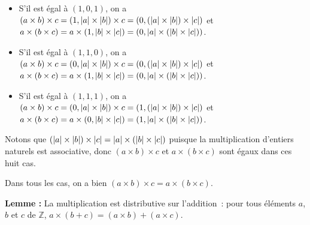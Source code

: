 \begin{itemize}[nosep]
\begin{itemize}[nosep]
                \item S'il est égal à $(1,0,1)$, on a 
                    $(a \times b) \times c = (1,\left\lvert a \right\rvert \times \left\lvert b \right\rvert) \times c = (0, (\left\lvert a \right\rvert \times \left\lvert b \right\rvert) \times \left\lvert c \right\rvert)$ et 
                    $a \times (b \times c) = a \times (1, \left\lvert b \right\rvert \times \left\lvert c \right\rvert) = (0, \left\lvert a \right\rvert \times (\left\lvert b \right\rvert \times \left\lvert c \right\rvert))$.
                \item S'il est égal à $(1,1,0)$, on a 
                    $(a \times b) \times c = (0,\left\lvert a \right\rvert \times \left\lvert b \right\rvert) \times c = (0, (\left\lvert a \right\rvert \times \left\lvert b \right\rvert) \times \left\lvert c \right\rvert)$ et 
                    $a \times (b \times c) = a \times (1, \left\lvert b \right\rvert \times \left\lvert c \right\rvert) = (0, \left\lvert a \right\rvert \times (\left\lvert b \right\rvert \times \left\lvert c \right\rvert))$.
                \item S'il est égal à $(1,1,1)$, on a 
                    $(a \times b) \times c = (0,\left\lvert a \right\rvert \times \left\lvert b \right\rvert) \times c = (1, (\left\lvert a \right\rvert \times \left\lvert b \right\rvert) \times \left\lvert c \right\rvert)$ et 
                    $a \times (b \times c) = a \times (0, \left\lvert b \right\rvert \times \left\lvert c \right\rvert) = (1, \left\lvert a \right\rvert \times (\left\lvert b \right\rvert \times \left\lvert c \right\rvert))$.
            \end{itemize}
            Notons que $(\left\lvert a \right\rvert \times \left\lvert b \right\rvert) \times \left\lvert c \right\rvert = \left\lvert a \right\rvert \times (\left\lvert b \right\rvert \times \left\lvert c \right\rvert)$ puisque la multiplication d'entiers naturels est associative, donc $(a \times b) \times c$ et $a \times (b \times c)$ sont égaux dans ces huit cas. 
    \end{itemize}
    Dans tous les cas, on a bien $(a \times b) \times c = a \times (b \times c)$.

   \done 

\medskip

\noindent\textbf{Lemme :} La multiplication est distributive sur l'addition : pour tous éléments $a$, $b$ et $c$ de $\mathbb{Z}$, $a \times (b + c) = (a \times b) + (a \times c)$.

\medskip

